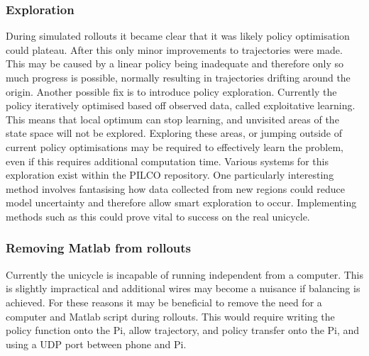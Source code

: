 \documentclass[twoside,twocolumn,12pt]{article}
\begin{document}
\subsubsection{Exploration}
During simulated rollouts it became clear that it was likely policy optimisation could plateau. After this only minor improvements to trajectories were made. This may be caused by a linear policy being inadequate and therefore only so much progress is possible, normally resulting in trajectories drifting around the origin.
\newline
Another possible fix is to introduce policy exploration. Currently the policy iteratively optimised based off observed data, called exploitative learning. This means that local optimum can stop learning, and unvisited areas of the state space will not be explored. Exploring these areas, or jumping outside of current policy optimisations may be required to effectively learn the problem, even if this requires additional computation time. 
\newline
Various systems for this exploration exist within the PILCO repository. One particularly interesting method involves fantasising how data collected from new regions could reduce model uncertainty and therefore allow smart exploration to occur. \cite{exp}
\newline
Implementing methods such as this could prove vital to success on the real unicycle.
\subsubsection{Removing Matlab from rollouts}
Currently the unicycle is incapable of running independent from a computer. This is slightly impractical and additional wires may become a nuisance if balancing is achieved. For these reasons it may be beneficial to remove the need for a computer and Matlab script during rollouts. This would require writing the policy function onto the Pi, allow trajectory, and policy transfer onto the Pi, and using a UDP port between phone and Pi.

\clearpage
\end{document}

